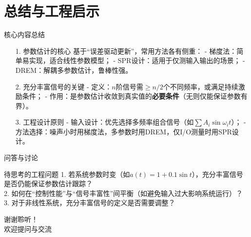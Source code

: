 \documentclass{beamer}
\begin{document}
\section{总结与工程启示}
\begin{frame}{核心内容总结}
  \begin{enumerate}
    \item[1. 参数估计的核心]
      基于“误差驱动更新”，常用方法各有侧重：
      - 梯度法：简单易实现，适合线性参数模型；
      - SPR设计：适用于仅测输入输出的场景；
      - DREM：解耦多参数估计，鲁棒性强。

    \item[2. 充分丰富信号的关键]
      - 定义：$n$阶信号需$\geq n/2$个不同频率，或满足持续激励条件；
      - 作用：是参数估计收敛到真实值的\textbf{必要条件}（无则仅能保证参数有界）。

    \item[3. 工程设计原则]
      - 输入设计：优先选择多频率组合信号（如$\sum A_i\sin\omega_i t$）；
      - 方法选择：噪声小时用梯度法，多参数时用DREM，仅I/O测量时用SPR设计。
  \end{enumerate}
\end{frame}

\begin{frame}{问答与讨论}
  \begin{block}{待思考的工程问题}
    1. 若系统参数时变（如$a(t)=1+0.1\sin t$），充分丰富信号是否仍能保证参数估计跟踪？\\
    2. 如何在“控制性能”与“信号丰富性”间平衡（如避免输入过大影响系统运行）？\\
    3. 对于非线性系统，充分丰富信号的定义是否需要调整？
  \end{block}

  \vspace{1cm}
  \begin{center}
    \Huge{谢谢聆听！}\\
    \vspace{0.5cm}
    \Large{欢迎提问与交流}
  \end{center}
\end{frame}
\end{document}

